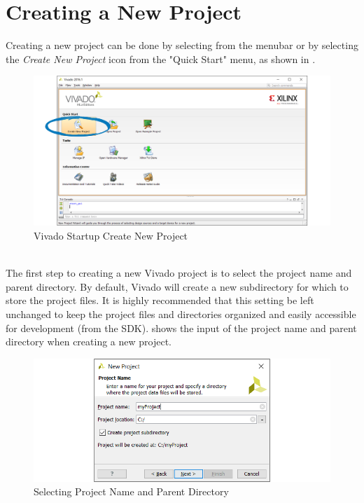 \section{Creating a New Project}

Creating a new project can be done by selecting  from the menubar or by selecting the \textit{Create New Project} icon from the "Quick Start" menu, as shown in . \\


\begin{figure}
	\centering
	\includegraphics{images/vivado/create_new_project.png}
	\caption[Vivado Startup Create New Project]{Vivado Startup Create New Project}
	\label{fig:vivadostartcreate}
\end{figure}


~\\
The first step to creating a new Vivado project is to select the project name and parent directory. By default, Vivado will create a new subdirectory for which to store the project files. It is highly recommended that this setting be left unchanged to keep the project files and directories organized and easily accessible for development (\ie from the SDK).  shows the input of the project name and parent directory when creating a new project.


\begin{figure}
	\centering
	\includegraphics{images/vivado/new_project_name.png}
	\caption{Selecting Project Name and Parent Directory}
	\label{fig:vivadonewprojectname}
\end{figure}


